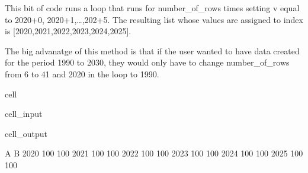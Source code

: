 \documentclass[letterpaper,10pt,english]{jupyterBook}
\begin{document}
\sphinxAtStartPar
This bit of code runs a loop that runs for number\_of\_rows times setting v equal to 2020+0, 2020+1,…,202+5. The resulting list whose values are assigned to index is {[}2020,2021,2022,2023,2024,2025{]}.

\sphinxAtStartPar
The big advanatge of this method is that if the user wanted to have data created for the period 1990 to 2030, they would only have to change number\_of\_rows from 6 to 41 and 2020 in the loop to 1990.

\begin{sphinxuseclass}{cell}\begin{sphinxVerbatimInput}

\begin{sphinxuseclass}{cell_input}
\begin{sphinxVerbatim}[commandchars=\\\{\}]
   

  
       \PYG{p}{[}    \PYG{p}{]} 
       \PYG{p}{[}\PYG{p}{]}                                 
\end{sphinxVerbatim}

\end{sphinxuseclass}\end{sphinxVerbatimInput}
\begin{sphinxVerbatimOutput}

\begin{sphinxuseclass}{cell_output}
\begin{sphinxVerbatim}[commandchars=\\\{\}]
        A    B
2020  100  100
2021  100  100
2022  100  100
2023  100  100
2024  100  100
2025  100  100
\end{sphinxVerbatim}

\end{sphinxuseclass}\end{sphinxVerbatimOutput}

\end{sphinxuseclass}
\end{document}
